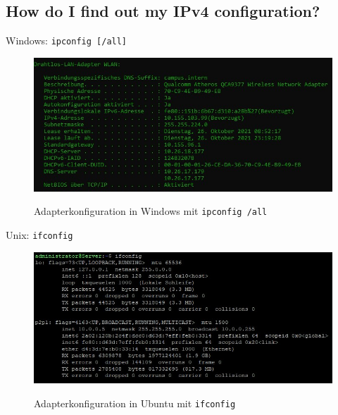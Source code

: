 \subsection*{How do I find out my IPv4 configuration?}
\begin{multicols}{2}
    Windows: \texttt{ipconfig [/all]}
    \begin{figure}[H]
        \begin{center}
        \label{pic:ipconfig}
        \includegraphics[width=.5\textwidth]{images/ipconfig.jpg}
        \caption{Adapterkonfiguration in Windows mit \texttt{ipconfig /all}}
        \end{center}
    \end{figure}
    \columnbreak
    Unix: \texttt{ifconfig}
    \begin{figure}[H]
        \begin{center}
        \label{pic:ifconfig}
        \includegraphics[width=.5\textwidth]{images/ifconfig.jpg}
        \caption{Adapterkonfiguration in Ubuntu mit \texttt{ifconfig}}
        \end{center}
    \end{figure}
\end{multicols}
